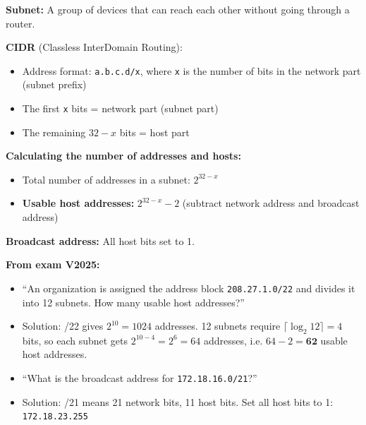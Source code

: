 \begin{exambox}
\textbf{Subnet:} A group of devices that can reach each other without going through a router.

\textbf{CIDR} (Classless InterDomain Routing):
\begin{itemize}[noitemsep]
    \item Address format: \texttt{a.b.c.d/x}, where \texttt{x} is the number of bits in the network part (subnet prefix)
    \item The first \texttt{x} bits = network part (subnet part)
    \item The remaining $32 - x$ bits = host part
\end{itemize}

\medskip
\textbf{Calculating the number of addresses and hosts:}
\begin{itemize}[noitemsep]
    \item Total number of addresses in a subnet: $2^{32-x}$
    \item \textbf{Usable host addresses:} $2^{32-x} - 2$ (subtract network address and broadcast address)
\end{itemize}

\medskip
\textbf{Broadcast address:} All host bits set to 1.

\medskip
\textbf{From exam V2025:}
\begin{itemize}[noitemsep]
    \item ``An organization is assigned the address block \texttt{208.27.1.0/22} and divides it into 12 subnets. How many usable host addresses?''
    \item Solution: /22 gives $2^{10} = 1024$ addresses. 12 subnets require $\lceil\log_2 12\rceil = 4$ bits, so each subnet gets $2^{10-4} = 2^6 = 64$ addresses, i.e. $64 - 2 = \textbf{62}$ usable host addresses.
    \item ``What is the broadcast address for \texttt{172.18.16.0/21}?''
    \item Solution: /21 means 21 network bits, 11 host bits. Set all host bits to 1: \texttt{172.18.23.255}
\end{itemize}
\end{exambox}

\begin{imagebox}
\end{imagebox}

